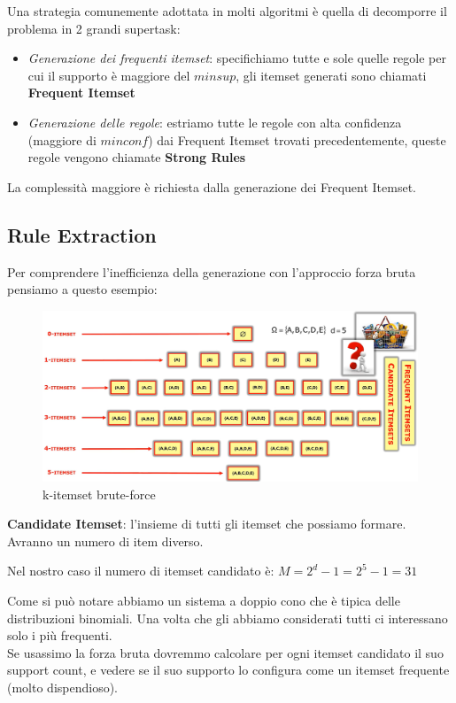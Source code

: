 Una strategia comunemente adottata in molti algoritmi è quella di decomporre il problema in 2 grandi supertask:
\begin{itemize}
	\item\textit{Generazione dei frequenti itemset}: specifichiamo tutte e sole quelle regole per cui il supporto è maggiore del $minsup$, gli itemset generati sono chiamati \textbf{Frequent Itemset}
	\item \textit{Generazione delle regole}: estriamo tutte le regole con alta confidenza (maggiore di $minconf$) dai Frequent Itemset trovati precedentemente, queste regole vengono chiamate \textbf{Strong Rules}
\end{itemize}
\noindent
La complessità maggiore è richiesta dalla generazione dei Frequent Itemset.


\subsection{Rule Extraction}

Per comprendere l'inefficienza della generazione con l'approccio forza bruta pensiamo a questo esempio:
\begin{figure}[H]
	\hspace{-0.7 cm}
	\includegraphics[height=0.5 \linewidth]{association/pict/k-itemset.png}
	\caption{k-itemset brute-force}
\end{figure}
\begin{defn}
	\textbf{Candidate Itemset}: l'insieme di tutti gli itemset che possiamo formare. Avranno un numero di item diverso. 
\end{defn}
Nel nostro caso il numero di itemset candidato è: $M = 2^{d} - 1 = 2^5 -1 = 31$

Come si può notare abbiamo un sistema a doppio cono che è tipica delle distribuzioni binomiali. Una volta che gli abbiamo considerati tutti ci interessano solo i più frequenti. \\
Se usassimo la forza bruta dovremmo calcolare per ogni itemset candidato il suo support count, e vedere se il suo supporto lo configura come un itemset frequente (molto dispendioso). 

